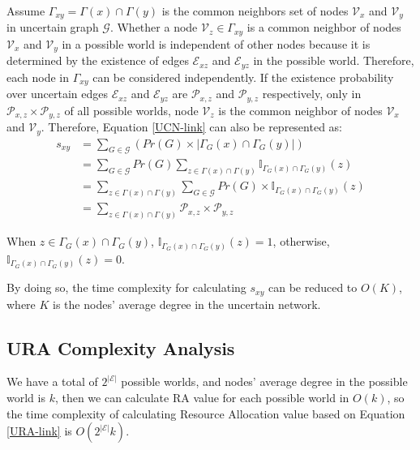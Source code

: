 \documentclass[\main/thesis.tex]{subfiles}
\begin{document}
Assume $\Gamma_{xy} = \Gamma(x)\cap\Gamma(y)$ is the common neighbors set of nodes $\mathcal{V}_x$ and $\mathcal{V}_y$ in uncertain graph $\mathcal{G}$. Whether a node $\mathcal{V}_z \in \Gamma_{xy}$ is a common neighbor of nodes $\mathcal{V}_x$ and $\mathcal{V}_y$ in a possible world is independent of other nodes because it is determined by the existence of edges $\mathcal{E}_{xz}$ and $\mathcal{E}_{yz}$ in the possible world. Therefore, each node in $\Gamma_{xy}$ can be considered independently. If the existence probability over uncertain edges $\mathcal{E}_{xz}$ and $\mathcal{E}_{yz}$ are $\mathcal{P}_{x,z}$ and $\mathcal{P}_{y,z}$ respectively, only in $\mathcal{P}_{x,z}\times\mathcal{P}_{y,z}$ of all possible worlds, node $\mathcal{V}_z$ is the common neighbor of nodes $\mathcal{V}_x$ and $\mathcal{V}_y$. Therefore, Equation \ref{UCN-link} can also be represented as:
\begin{align*}
s_{xy}&=\sum_{G\in \mathcal{G}}( Pr(G)\times|\Gamma_G(x)\cap\Gamma_G(y)|)\\
&=\sum_{G\in \mathcal{G}}Pr(G)\sum_{z\in \Gamma(x)\cap\Gamma(y)}\mathbb{I}_{\Gamma_G(x)\cap\Gamma_G(y)}(z)\\
&=\sum_{z\in \Gamma(x)\cap\Gamma(y)}\sum_{G\in \mathcal{G}}Pr(G)\times\mathbb{I}_{\Gamma_G(x)\cap\Gamma_G(y)}(z)\\
&=\sum_{z\in \Gamma(x)\cap\Gamma(y)}\mathcal{P}_{x,z}\times\mathcal{P}_{y,z}
\end{align*}

When $z\in \Gamma_G(x)\cap\Gamma_G(y)$, $\mathbb{I}_{\Gamma_G(x)\cap\Gamma_G(y)}(z)=1$, otherwise, $\mathbb{I}_{\Gamma_G(x)\cap\Gamma_G(y)}(z)=0$.

By doing so, the time complexity for calculating $s_{xy}$ can be reduced to $O(K)$, where $K$ is the nodes' average degree in the uncertain network.
\subsection{URA Complexity Analysis}
We have a total of $2^{|\mathcal{E}|}$ possible worlds, and nodes' average degree in the possible world is $k$, then we can calculate RA value for each possible world in $O(k)$, so the time complexity of calculating Resource Allocation value based on Equation \ref{URA-link} is $O(2^{|\mathcal{E}|}k)$.
\end{document}
